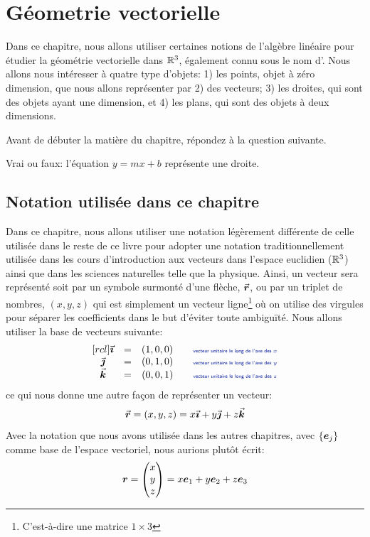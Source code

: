 \chapter{Géometrie vectorielle}


Dans ce chapitre, nous allons utiliser certaines notions de l'algèbre linéaire pour
étudier la géométrie vectorielle dans $\mathbb{R}^3$, également connu sous le nom
d'.   
Nous allons nous intéresser à quatre type d'objets: 1) les points, objet à
zéro dimension, que nous
allons représenter par 2) des vecteurs; 3) les droites, qui sont des objets
ayant une dimension, et 4) les plans, qui sont des objets à deux dimensions.

Avant de débuter la matière du chapitre, répondez à la question suivante.

\begin{exerciceC}
Vrai ou faux: l'équation $y=mx+b$ représente une droite.
\end{exerciceC}

\section{Notation utilisée dans ce chapitre}
Dans ce chapitre, nous allons utiliser une notation légèrement différente de celle
utilisée dans le reste de ce livre pour adopter une notation traditionnellement utilisée
dans les cours d'introduction aux vecteurs dans l'espace euclidien ($\mathbb{R}^3$) ainsi
que dans les sciences naturelles telle que la physique.  Ainsi, un vecteur sera
représenté soit par un symbole surmonté d'une flèche, $\vec{\boldsymbol{r}}$, ou
par un triplet de nombres, $(x, y, z)$ qui est simplement un 
vecteur ligne\footnote{C'est-à-dire une matrice $1\times 3$} où
on utilise des virgules pour séparer les coefficients dans le but d'éviter toute
ambiguïté. Nous allons utiliser la base de vecteurs suivante:
\[
\begin{matrix}[rcl]
\iunit &=& (1, 0, 0) \qquad \explain{vecteur unitaire le long de l'axe des $x$}\\
\junit &=& (0, 1, 0) \qquad \explain{vecteur unitaire le long de l'axe des $y$}\\
\kunit &=& (0, 0, 1) \qquad \explain{vecteur unitaire le long de l'axe des $z$}
\end{matrix}
\]
ce qui nous donne une autre façon de représenter un vecteur:
\[
\vec{\boldsymbol{r}} = (x, y, z) = x\vec{\boldsymbol{\imath}} + y\vec{\boldsymbol{\jmath}} + z\vec{\boldsymbol{k}}
\]
Avec la notation que nous avons utilisée dans les autres chapitres, avec $\{\boldsymbol{e}_j\}$ comme
base de l'espace vectoriel, nous aurions plutôt écrit:
\[
\boldsymbol{r} = \begin{pmatrix}
x \\ y \\ z
\end{pmatrix} = x\boldsymbol{e}_1 + y\boldsymbol{e}_2 + z\boldsymbol{e}_3
\]

